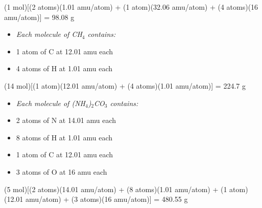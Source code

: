 (1 mol)[(2 atoms)(1.01 amu/atom) + (1 atom)(32.06 amu/atom) + (4 atoms)(16 amu/atom)] = 98.08 g

\vskip 10pt

\begin{itemize} 
\item{} {\it Each molecule of CH$_{4}$ contains:}
\item{} 1 atom of C at 12.01 amu each
\item{} 4 atoms of H at 1.01 amu each
\end{itemize} 

(14 mol)[(1 atom)(12.01 amu/atom) + (4 atoms)(1.01 amu/atom)] = 224.7 g

\vskip 10pt

\begin{itemize} 
\item{} {\it Each molecule of (NH$_{4}$)$_{2}$CO$_{3}$ contains:}
\item{} 2 atoms of N at 14.01 amu each
\item{} 8 atoms of H at 1.01 amu each
\item{} 1 atom of C at 12.01 amu each
\item{} 3 atoms of O at 16 amu each
\end{itemize} 

(5 mol)[(2 atoms)(14.01 amu/atom) + (8 atoms)(1.01 amu/atom) + (1 atom)(12.01 amu/atom) + (3 atoms)(16 amu/atom)] = 480.55 g












